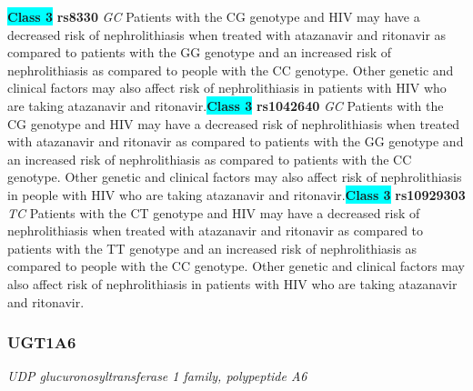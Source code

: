 \documentclass{report}
\begin{document}
\textbf{\colorbox{cyan} {Class 3}} \textbf{ rs8330 } \textit{ GC }
Patients with the CG genotype and HIV may have a decreased risk of nephrolithiasis when treated with atazanavir and ritonavir as compared to patients with the GG genotype and an increased risk of nephrolithiasis as compared to people with the CC genotype. Other genetic and clinical factors may also affect risk of nephrolithiasis in patients with HIV who are taking atazanavir and ritonavir.\newline\textbf{\colorbox{cyan} {Class 3}} \textbf{ rs1042640 } \textit{ GC }
Patients with the CG genotype and HIV may have a decreased risk of nephrolithiasis when treated with atazanavir and ritonavir as compared to patients with the GG genotype and an increased risk of nephrolithiasis as compared to patients with the CC genotype. Other genetic and clinical factors may also affect risk of nephrolithiasis in people with HIV who are taking atazanavir and ritonavir.\newline\textbf{\colorbox{cyan} {Class 3}} \textbf{ rs10929303 } \textit{ TC }
Patients with the CT genotype and HIV may have a decreased risk of nephrolithiasis when treated with atazanavir and ritonavir as compared to patients with the TT genotype and an increased risk of nephrolithiasis as compared to people with the CC genotype. Other genetic and clinical factors may also affect risk of nephrolithiasis in patients with HIV who are taking atazanavir and ritonavir. \newline\subsubsection{ UGT1A6 }
\textit{ UDP glucuronosyltransferase 1 family, polypeptide A6 }
\end{document}
